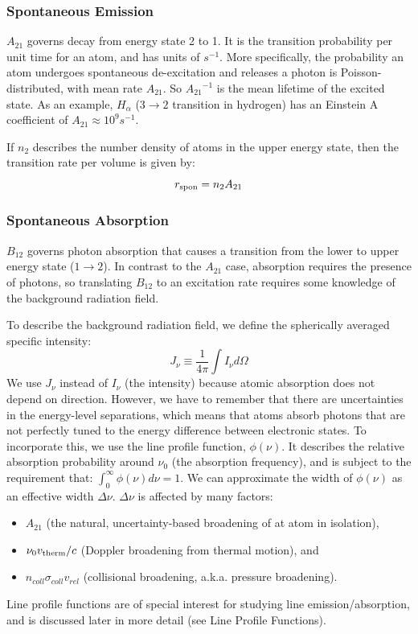 \documentclass{article}
\def\ato{{A_{21}}}
\def\bot{{B_{12}}}
\def\ato{{A_{21}}}
\def\bot{{B_{12}}}
\def\ato{{A_{21}}}
\def\bot{{B_{12}}}
\begin{document}
\subsubsection{Spontaneous Emission}

$\ato$ governs decay from energy state 2 to 1.  It is the transition 
probability per unit time for an atom, and has units of $s^{-1}$.  More specifically, the probability an atom
undergoes spontaneous de-excitation and releases a photon is Poisson-distributed, with mean rate
$\ato$. So $\ato^{-1}$ is the mean lifetime of the excited state.   As an example,
$H_\alpha$ ($3\to2$ transition in hydrogen) has an Einstein A coefficient of $\ato\approx 10^9 s^{-1}$.

If $n_2$ describes the number density of atoms in the upper energy state, then the transition rate per volume is given by:
\begin{equation}
r_{\rm spon}=n_2\ato
\end{equation}

\subsubsection{Spontaneous Absorption}

$\bot$ governs photon absorption that causes a transition from the lower to upper energy state ($1\to2$).  In contrast
to the $\ato$ case, absorption requires the presence of photons, so translating $\bot$ to an excitation rate requires
some knowledge of the background radiation field.

To describe the background radiation field, we define the spherically averaged specific intensity:
\begin{equation}
J_\nu \equiv \frac1{4\pi}\int{I_\nu d\Omega}
\end{equation}
We use $J_\nu$ instead of $I_\nu$ (the intensity) because atomic absorption does not depend on direction.
However, we have to remember that there are uncertainties in the energy-level
separations, which means that atoms absorb photons that are not perfectly tuned to
the energy difference between electronic states.  To incorporate this, we use the line profile function, $\phi(\nu)$.  It 
describes
the relative absorption probability around $\nu_0$ (the
absorption frequency), and is subject to the requirement that:
$\int_0^\infty{\phi(\nu)d\nu}=1$.  We can approximate the width of $\phi(\nu)$ as an effective width $\Delta\nu$.
$\Delta\nu$ is affected by many factors:
\begin{itemize}
\item $\ato$ (the natural, uncertainty-based broadening of at atom in isolation),
\item $\nu_0 v_{\rm therm}/c$ (Doppler broadening from thermal motion), and 
\item $n_{coll}\sigma_{coll}v_{rel}$
(collisional broadening, a.k.a. pressure broadening). 
\end{itemize}
Line profile functions are of special interest for studying line emission/absorption, and is discussed later in more detail (see Line Profile Functions).
\end{document}
